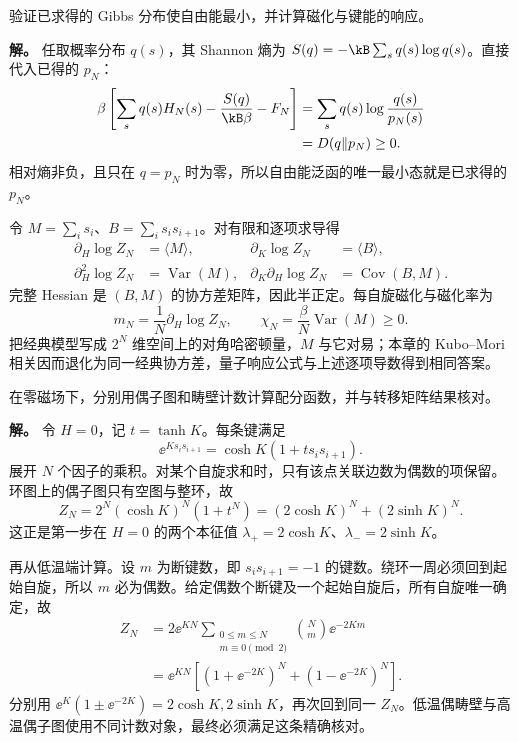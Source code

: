 \begin{exbox}
验证已求得的 Gibbs 分布使自由能最小，并计算磁化与键能的响应。

\textbf{解。} 任取概率分布 $q(s)$，其 Shannon 熵为 $S(q)=-\kB\sum_s q(s)\log q(s)$。直接代入已得的 $p_N$：
\begin{align*}
\beta\left[\sum_s q(s)H_N(s)-\frac{S(q)}{\kB\beta}-F_N\right]
&=\sum_s q(s)\log\frac{q(s)}{p_N(s)}\\
&=D(q\Vert p_N)\ge0.
\end{align*}
相对熵非负，且只在 $q=p_N$ 时为零，所以自由能泛函的唯一最小态就是已求得的 $p_N$。

令 $M=\sum_i s_i$、$B=\sum_i s_is_{i+1}$。对有限和逐项求导得
\begin{align*}
\partial_H\log Z_N&=\langle M\rangle,&
\partial_K\log Z_N&=\langle B\rangle,\\
\partial_H^2\log Z_N&=\operatorname{Var}(M),&
\partial_K\partial_H\log Z_N&=\operatorname{Cov}(B,M).
\end{align*}
完整 Hessian 是 $(B,M)$ 的协方差矩阵，因此半正定。每自旋磁化与磁化率为
\[
m_N=\frac1N\partial_H\log Z_N,
\qquad
\chi_N=\frac{\beta}{N}\operatorname{Var}(M)\ge0.
\]
把经典模型写成 $2^N$ 维空间上的对角哈密顿量，$M$ 与它对易；本章的 Kubo--Mori 相关因而退化为同一经典协方差，量子响应公式与上述逐项导数得到相同答案。
\end{exbox}

\begin{exbox}
在零磁场下，分别用偶子图和畴壁计数计算配分函数，并与转移矩阵结果核对。

\textbf{解。} 令 $H=0$，记 $t=\tanh K$。每条键满足
\[
\ee^{Ks_is_{i+1}}=\cosh K(1+ts_is_{i+1}).
\]
展开 $N$ 个因子的乘积。对某个自旋求和时，只有该点关联边数为偶数的项保留。环图上的偶子图只有空图与整环，故
\[
Z_N=2^N(\cosh K)^N(1+t^N)
=(2\cosh K)^N+(2\sinh K)^N.
\]
这正是第一步在 $H=0$ 的两个本征值 $\lambda_+=2\cosh K$、$\lambda_-=2\sinh K$。

再从低温端计算。设 $m$ 为断键数，即 $s_is_{i+1}=-1$ 的键数。绕环一周必须回到起始自旋，所以 $m$ 必为偶数。给定偶数个断键及一个起始自旋后，所有自旋唯一确定，故
\begin{align*}
Z_N
&=2\ee^{KN}\sum_{\substack{0\le m\le N\\m\equiv0\pmod2}}
\binom Nm\ee^{-2Km}\\
&=\ee^{KN}\left[(1+\ee^{-2K})^N+(1-\ee^{-2K})^N\right].
\end{align*}
分别用 $\ee^K(1\pm\ee^{-2K})=2\cosh K,2\sinh K$，再次回到同一 $Z_N$。低温偶畴壁与高温偶子图使用不同计数对象，最终必须满足这条精确核对。
\end{exbox}

